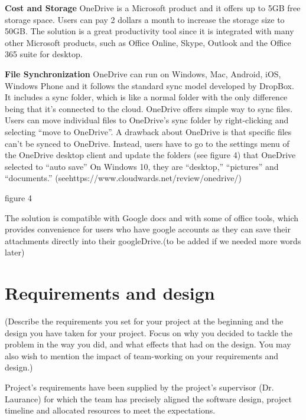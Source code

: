 \documentclass{article}
\begin{document}
\newline
\hfill \break
\textbf{Cost and Storage}
OneDrive is a Microsoft product and it offers up to 5GB free storage space. Users can pay 2 dollars a month to increase the storage size to 50GB. The solution is a great productivity tool since it is integrated with many other Microsoft products, such as Office Online, Skype, Outlook and the Office 365 suite for desktop.

\newline
\hfill \break
\textbf{File Synchronization}
OneDrive can run on Windows, Mac, Android, iOS, Windows Phone and it follows the standard sync model developed by DropBox. It includes a sync folder, which is like a normal folder with the only difference being that it’s connected to the cloud. OneDrive offers simple way to sync files. Users can move individual files to OneDrive’s sync folder by right-clicking and selecting “move to OneDrive”. A drawback about OneDrive is that specific files can’t be synced to OneDrive. Instead, users have to go to the settings menu of the OneDrive desktop client and update the folders (see figure 4) that OneDrive selected to “auto save” On Windows 10, they are “desktop,” “pictures” and “documents.” (seehttps://www.cloudwards.net/review/onedrive/)

figure 4

The solution is compatible with Google docs and with some of office tools, which provides convenience for users who have google accounts as they can save their attachments directly into their googleDrive.(to be added if we needed more words later)


\section{Requirements and design}
(Describe the requirements you set for your project at the beginning and the design you have taken for your project. Focus on why you decided to tackle the problem in the way you did, and what effects that had on the design. You may also wish to mention the impact of team-working on your requirements and design.)

Project’s requirements have been supplied by the project’s supervisor (Dr. Laurance) for which the team has precisely aligned the software design, project timeline and allocated resources to meet the expectations.
\end{document}
